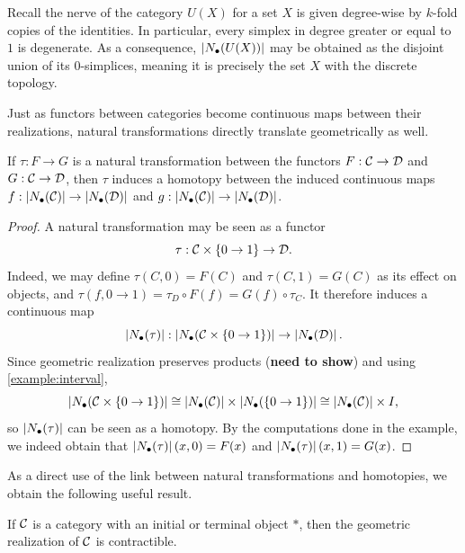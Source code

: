 \begin{example}
    
\end{example}
\begin{example}\label{example:discrete_cat_realisation}
    Recall the nerve of the category $U(X)$ for a set $X$ is given degree-wise by $k$-fold copies of the identities. In particular, every simplex in degree greater or equal to $1$ is degenerate. As a consequence, $\left| N_{\bullet}\lparen U(X) \rparen \right|$ may be obtained as the disjoint union of its $0$-simplices, meaning it is precisely the set $X$ with the discrete topology.
\end{example}

Just as functors between categories become continuous maps between their realizations, natural transformations directly translate geometrically as well.

\begin{proposition}
    If $\tau: F \to G$ is a natural transformation between the functors $F : \mathcal{C} \to \mathcal{D}$ and $G : \mathcal{C} \to \mathcal{D}$, then $\tau$ induces a homotopy between the induced continuous maps $f : \left| N_{\bullet}(\mathcal{C}) \right| \to \left| N_{\bullet}(\mathcal{D}) \right|$ and $g : \left| N_{\bullet}(\mathcal{C}) \right| \to \left| N_{\bullet}(\mathcal{D}) \right|$.
\end{proposition}

\begin{proof}
    A natural transformation may be seen as a functor
    \[ \tau: \mathcal{C} \times \{0 \to 1 \} \to \mathcal{D}. \]
    Indeed, we may define $\tau(C, 0) = F(C)$ and $\tau(C, 1) = G(C)$ as its effect on objects, and $\tau(f, 0 \to 1) = \tau_D \circ F(f) = G(f) \circ \tau_C$. It therefore induces a continuous map
    \[ \left| N_{\bullet}\lparen \tau \rparen \right| : \left| N_{\bullet}\lparen \mathcal{C} \times \{0 \to 1\} \rparen \right| \to \left| N_{\bullet}\lparen \mathcal{D} \rparen \right|. \]
    Since geometric realization preserves products (\textbf{need to show}) and using \cref{example:interval}, 
    \[ \left| N_{\bullet}\lparen \mathcal{C} \times \{0 \to 1\} \rparen \right| \cong \left| N_{\bullet}\lparen \mathcal{C} \rparen \right| \times \left| N_{\bullet}\lparen \{0 \to 1\} \rparen \right| \cong \left| N_{\bullet}\lparen \mathcal{C} \rparen \right| \times I, \]
    so $\left| N_{\bullet}\lparen \tau \rparen \right|$ can be seen as a homotopy. By the computations done in the example, we indeed obtain that $\left| N_{\bullet}\lparen \tau \rparen \right|(x,0) = F(x)$ and $\left| N_{\bullet}\lparen \tau \rparen \right|(x,1) = G(x)$.
\end{proof}

As a direct use of the link between natural transformations and homotopies, we obtain the following useful result.

\begin{proposition}\label{proposition:terminal_implies_contractible}
    If $\mathcal{C}$ is a category with an initial or terminal object $*$, then the geometric realization of $\mathcal{C}$ is contractible.
\end{proposition}

